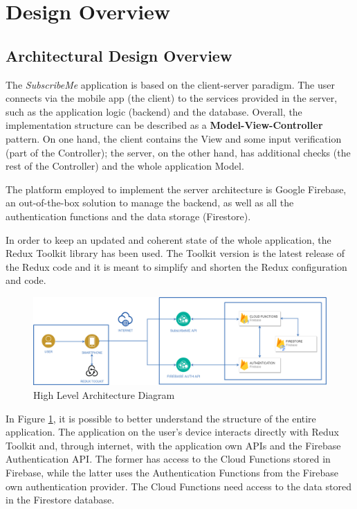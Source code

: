 \documentclass[12pt]{article}
\begin{document}
\newpage
\section{Design Overview}\label{sec:design}
\subsection{Architectural Design Overview}
The \textit{SubscribeMe} application is based on the client-server paradigm. The user connects via the mobile app (the client) to the services provided in the server, such as the application logic (backend) and the database. Overall, the implementation structure can be described as a \textbf{Model-View-Controller} pattern. On one hand, the client contains the View and some input verification (part of the Controller); the server, on the other hand, has additional checks (the rest of the Controller) and the whole application Model.

The platform employed to implement the server architecture is Google Firebase, an out-of-the-box solution to manage the backend, as well as all the authentication functions and the data storage (Firestore).

\noindent In order to keep an updated and coherent state of the whole application, the Redux Toolkit library has been used. The Toolkit version is the latest release of the Redux code and it is meant to simplify and shorten the Redux configuration and code.

\begin{figure}[h]
    \begin{center}
        \includegraphics[width=\textwidth, clip]{../../assets/highLevel.png}
    \end{center}
    \caption{High Level Architecture Diagram}
    \label{fig:highLevel}
\end{figure}

In Figure \ref{fig:highLevel}, it is possible to better understand the structure of the entire application.
The application on the user's device interacts directly with Redux Toolkit and, through internet, with the application own APIs and the Firebase Authentication API. The former has access to the Cloud Functions stored in Firebase, while the latter uses the Authentication Functions from the Firebase own authentication provider. The Cloud Functions need access to the data stored in the Firestore database.
\end{document}

